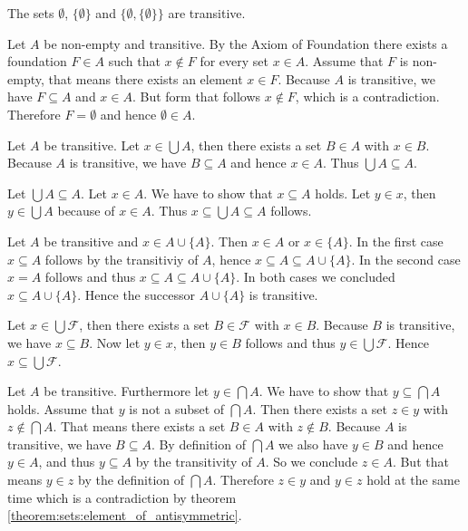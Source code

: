 \begin{solution}
    \begin{solutionenumerate}
        \item The sets $\emptyset$, $\{\emptyset\}$ and $\{\emptyset,\{\emptyset\}\}$ are transitive.
        \item Let $A$ be non-empty and transitive. By the Axiom of Foundation there exists a foundation $F\in A$ such that $x\notin F$ for every set $x\in A$. Assume that $F$ is non-empty, that means there exists an element $x\in F$. Because $A$ is transitive, we have $F\subseteq A$ and $x\in A$. But form that follows $x\notin F$, which is a contradiction. Therefore $F=\emptyset$ and hence $\emptyset\in A$.
        \item \proofright Let $A$ be transitive. Let $x\in\bigcup A$, then there exists a set $B\in A$ with $x\in B$. Because $A$ is transitive, we have $B\subseteq A$ and hence $x\in A$. Thus $\bigcup A\subseteq A$.
        
        \proofleft Let $\bigcup A\subseteq A$. Let $x\in A$. We have to show that $x\subseteq A$ holds. Let $y\in x$, then $y\in\bigcup A$ because of $x\in A$. Thus $x\subseteq\bigcup A\subseteq A$ follows.
        
        \item Let $A$ be transitive and $x\in A\cup\{A\}$. Then $x\in A$ or $x\in \{A\}$. In the first case $x\subseteq A$ follows by the transitiviy of $A$, hence $x\subseteq A\subseteq A\cup\{A\}$. In the second case $x=A$ follows and thus $x\subseteq A\subseteq A\cup\{A\}$. In both cases we concluded $x\subseteq A\cup\{A\}$. Hence the successor $A\cup\{A\}$ is transitive.
        
        \item Let $x\in\bigcup\mathcal F$, then there exists a set $B\in\mathcal F$ with $x\in B$. Because $B$ is transitive, we have $x\subseteq B$. Now let $y\in x$, then $y\in B$ follows and thus $y\in \bigcup\mathcal F$. Hence $x\subseteq\bigcup\mathcal F$.
        
        \item Let $A$ be transitive. Furthermore let $y\in \bigcap A$. We have to show that $y\subseteq\bigcap A$ holds. Assume that $y$ is not a subset of $\bigcap A$. Then there exists a set $z\in y$ with $z\notin\bigcap A$. That means there exists a set $B\in A$ with $z\notin B$. Because $A$ is transitive, we have $B\subseteq A$. By definition of $\bigcap A$ we also have $y\in B$ and hence $y\in A$, and thus $y\subseteq A$ by the transitivity of $A$. So we conclude $z\in A$. But that means $y\in z$ by the definition of $\bigcap A$. Therefore $z\in y$ and $y\in z$ hold at the same time which is a contradiction by theorem \ref{theorem:sets:element_of_antisymmetric}.
    \end{solutionenumerate}
\end{solution}
